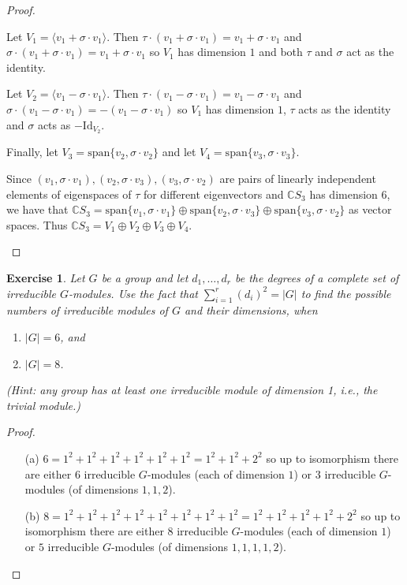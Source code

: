 \documentclass{article}
\newtheorem{exercise}[theorem]{Exercise}
\begin{document}
\begin{proof}
\begin{enumerate}
Let $V_1=\langle v_1+\sigma\cdot v_1\rangle$. Then $\tau\cdot(v_1+\sigma\cdot v_1)=v_1+\sigma\cdot v_1$ and $\sigma\cdot(v_1+\sigma\cdot v_1)=v_1+\sigma\cdot v_1$ so $V_1$ has dimension $1$ and both $\tau$ and $\sigma$ act as the identity.

Let $V_2=\langle v_1-\sigma\cdot v_1\rangle$. Then $\tau\cdot(v_1-\sigma\cdot v_1)=v_1-\sigma\cdot v_1$ and $\sigma\cdot(v_1-\sigma\cdot v_1)=-(v_1-\sigma\cdot v_1)$ so $V_1$ has dimension $1$, $\tau$ acts as the identity and $\sigma$ acts as $-\text{Id}_{V_2}$.

Finally, let $V_3=\text{span}\{v_2,\sigma\cdot v_2\}$ and let $V_4=\text{span}\{v_3,\sigma\cdot v_3\}$.

Since $(v_1,\sigma\cdot v_1),(v_2,\sigma\cdot v_3),(v_3,\sigma\cdot v_2)$ are pairs of linearly independent elements of eigenspaces of $\tau$ for different eigenvectors and $\mathbb{C}S_3$ has dimension $6$, we have that $\mathbb{C}S_3=\text{span}\{v_1,\sigma\cdot v_1\}\oplus\text{span}\{v_2,\sigma\cdot v_3\}\oplus\text{span}\{v_3,\sigma\cdot v_2\}$ as vector spaces. Thus $\mathbb{C}S_3=V_1\oplus V_2\oplus V_3\oplus V_4$.
\end{enumerate}
\end{proof}

\begin{exercise}
    Let \( G \) be a group and let \( d_1, \dots, d_r \) be the degrees of a complete set of irreducible \( G \)-modules. Use the fact that \(\sum_{i=1}^r (d_i)^2 = |G|\) to find the possible numbers of irreducible modules of \( G \) and their dimensions, when
    \begin{enumerate}
        \item \(|G| = 6\), and
        \item \(|G| = 8\).
    \end{enumerate}
    (Hint: any group has at least one irreducible module of dimension 1, i.e., the trivial module.)
\end{exercise}
\begin{proof}
\begin{enumerate}
    \item[(a)] $6=1^2+1^2+1^2+1^2+1^2+1^2=1^2+1^2+2^2$ so up to isomorphism there are either $6$ irreducible $G$-modules (each of dimension $1$) or $3$ irreducible $G$-modules (of dimensions $1,1,2$).
    \item[(b)] $8=1^2+1^2+1^2+1^2+1^2+1^2+1^2+1^2=1^2+1^2+1^2+1^2+2^2$ so up to isomorphism there are either $8$ irreducible $G$-modules (each of dimension $1$) or $5$ irreducible $G$-modules (of dimensions $1,1,1,1,2$).
\end{enumerate}
\end{proof}
\end{document}

